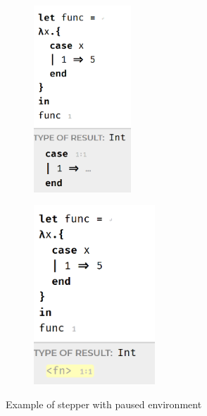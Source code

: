 \begin{figure}[htbp]
    \centering
    \begin{subfigure}[b]{0.4\textwidth}
        \centering
        \includegraphics[width=0.4\textwidth]{img/case1.png}
        \caption{}
        \label{fig:pause1}
    \end{subfigure}
    \begin{subfigure}[b]{0.4\textwidth}
        \centering
        \includegraphics[width=0.5\textwidth]{img/case2.png}
        \caption{}
        \label{fig:pause2}
    \end{subfigure}
    \caption{Example of stepper with paused environment}
\end{figure}